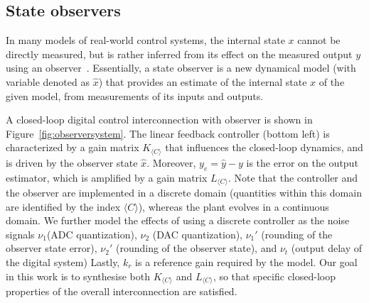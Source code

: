 \documentclass[sigconf]{llncs}
\newcommand{\mat}[1]{{#1}}
\renewcommand{\vec}[1]{{#1}}
\begin{document}
\subsection{State observers}\label{sec:observer}
In many models of real-world control systems, 
the internal state $x$ cannot be directly measured,  
but is rather inferred from its effect on the measured output $\vec{y}$ using an observer~\cite{Astrom08}.  
Essentially, a state observer is a new dynamical model (with variable denoted as $\hat{\vec{x}}$) 
that provides an estimate of the internal state $x$ of the given model, 
from measurements of its inputs and outputs. 

A closed-loop digital control interconnection with observer is shown in Figure~\ref{fig:observersystem}. 
The linear feedback controller (bottom left) is characterized by a gain matrix $\mat{K}_{\langle C \rangle}$ that influences the closed-loop dynamics, 
and is driven by the observer state $\hat{\vec{x}}$.  
Moreover, $\vec{y}_e=\hat{\vec{y}} - \vec{y}$ is the error on the output estimator,  
which is amplified by a gain matrix $\mat{L}_{\langle C \rangle}$.
Note that the controller and the observer are implemented in a discrete domain 
(quantities within this domain are identified by the index $\langle C \rangle$), 
whereas the plant evolves in a continuous domain. 
We further model the effects of using a discrete controller as the noise signals $\nu_1$(ADC quantization), $\nu_2$ (DAC quantization), $\nu_1'$ (rounding of the observer state error),
$\nu_2'$ (rounding of the observer state), and $\nu_t$ (output delay of the digital system) 
Lastly, $k_r$ is a reference gain required by the model.  
Our goal in this work is to synthesise both $\mat{K}_{\langle C \rangle}$ and $\mat{L}_{\langle C \rangle}$, 
 so that specific closed-loop properties of the overall interconnection are satisfied.
 
\end{document}
